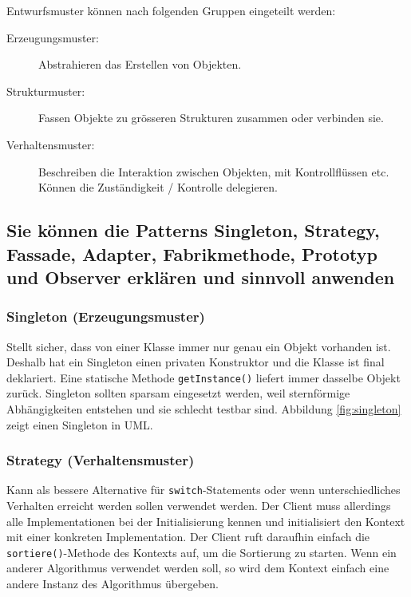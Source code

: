 Entwurfsmuster können nach folgenden Gruppen eingeteilt werden:
\begin{description}
  \item[Erzeugungsmuster:] Abstrahieren das Erstellen von Objekten.
  \item[Strukturmuster:] Fassen Objekte zu grösseren Strukturen zusammen oder verbinden sie.
  \item[Verhaltensmuster:] Beschreiben die Interaktion zwischen Objekten, mit Kontrollflüssen etc. Können die Zuständigkeit / Kontrolle delegieren.
\end{description}

\newpage

\subsection{Sie können die Patterns Singleton, Strategy, Fassade, Adapter, Fabrikmethode, Prototyp und Observer erklären und sinnvoll anwenden}
\label{sec:patterns}

\subsubsection{Singleton (Erzeugungsmuster)}
Stellt sicher, dass von einer Klasse immer nur genau ein Objekt vorhanden ist. Deshalb hat ein Singleton einen privaten Konstruktor und die Klasse ist final deklariert. Eine statische Methode \texttt{getInstance()} liefert immer dasselbe Objekt zurück. Singleton sollten sparsam eingesetzt werden, weil sternförmige Abhängigkeiten entstehen und sie schlecht testbar sind. Abbildung \ref{fig:singleton} zeigt einen Singleton in UML.
    

\subsubsection{Strategy (Verhaltensmuster)}
\label{sec:strategypattern}
Kann als bessere Alternative für \texttt{switch}-Statements oder wenn unterschiedliches Verhalten erreicht werden sollen verwendet werden. Der Client muss allerdings alle Implementationen bei der Initialisierung kennen und initialisiert den Kontext mit einer konkreten Implementation. Der Client ruft daraufhin einfach die \texttt{sortiere()}-Methode des Kontexts auf, um die Sortierung zu starten. Wenn ein anderer Algorithmus verwendet werden soll, so wird dem Kontext einfach eine andere Instanz des Algorithmus übergeben.

